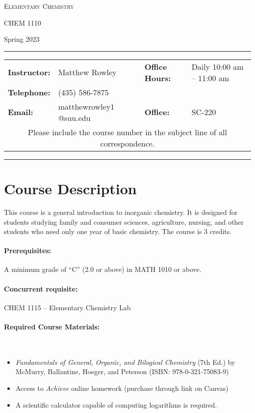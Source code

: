 \documentclass[12pt, letterpaper]{article}
\begin{document}
\begin{center}
	{\Large \textsc{Elementary Chemistry}}

	CHEM 1110
\end{center}
\begin{center}
	{\large Spring 2023}
\end{center}
\begin{center}
	\rule{0.99\textwidth}{0.4pt}
	\begin{tabular}{llcll}
		\textbf{Instructor:} & Matthew Rowley           &  & \textbf{Office Hours:} & Daily 10:00 am -- 11:00 am \\
		\textbf{Telephone:}  & (435) 586-7875           &  &                        &                            \\
		\textbf{Email:}      & matthewrowley$1$@suu.edu &  & \textbf{Office:}       & SC-220                     \\
		\multicolumn{5}{c}{Please include the course number in the subject line of all correspondence.}
	\end{tabular}
	\rule{0.99\textwidth}{0.4pt}
\end{center}

\section*{Course Description}
This course is a general introduction to inorganic chemistry. It is designed for students studying family and consumer sciences, agriculture, nursing, and other students who need only one year of basic chemistry. The course is 3 credits.

\paragraph{Prerequisites:}
A minimum grade of ``C'' (2.0 or above) in MATH 1010 or above.

\paragraph{Concurrent requisite:}
CHEM 1115 -- Elementary Chemistry Lab

\paragraph{Required Course Materials:} ~

\begin{itemize}
	\item \emph{Fundamentals of General, Organic, and Bilogical Chemistry} (7th Ed.) by McMurry, Ballantine, Hoeger, and Peterson (ISBN: 978-0-321-75083-9)
	\item Access to \emph{Achieve} online homework (purchase through link on Canvas)
	\item A scientific calculator capable of computing logarithms is required.
\end{itemize}
\end{document}
